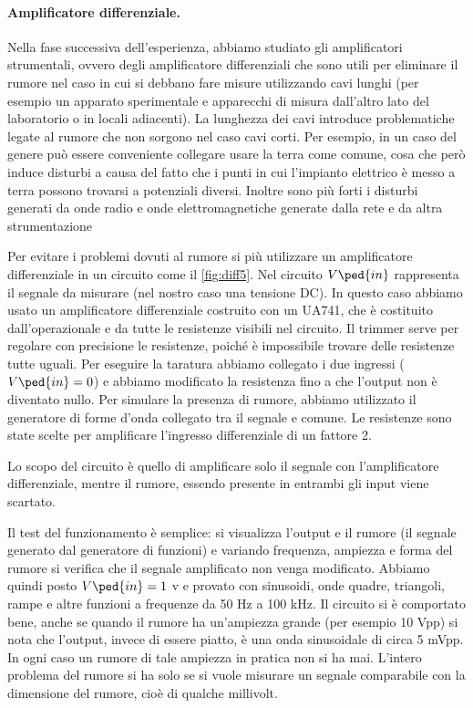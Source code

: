 \paragraph{Amplificatore differenziale.}

Nella fase successiva dell'esperienza, abbiamo studiato gli amplificatori strumentali, ovvero degli
amplificatore differenziali che sono utili per eliminare il rumore nel caso in cui si debbano fare misure
utilizzando cavi lunghi (per esempio un apparato sperimentale e apparecchi di misura dall'altro lato
del laboratorio o in locali adiacenti). La lunghezza dei cavi introduce problematiche legate al rumore che non
sorgono nel caso cavi corti. Per esempio, in un caso del genere può essere conveniente collegare usare la terra
come comune, cosa che però induce disturbi a causa del fatto che i punti in cui l'impianto elettrico è messo a terra
possono trovarsi a potenziali diversi. Inoltre sono più forti i disturbi generati da onde radio e onde elettromagnetiche
generate dalla rete e da altra strumentazione

Per evitare i problemi dovuti al rumore si più utilizzare un amplificatore differenziale in un circuito come il
\ref{fig:diff5}. Nel circuito $V\ped{in}$ rappresenta il segnale da misurare (nel nostro caso una tensione DC).
In questo caso abbiamo usato un amplificatore differenziale costruito con un UA741, che è costituito dall'operazionale
e da tutte le resistenze visibili nel circuito. Il trimmer serve per regolare con precisione le resistenze,
poiché è impossibile trovare delle resistenze tutte uguali. Per eseguire la taratura abbiamo collegato i due ingressi
($V\ped{in} = 0$) e abbiamo modificato la resistenza fino a che l'output non è diventato nullo. 
Per simulare la presenza di rumore, abbiamo utilizzato il generatore di forme d'onda collegato tra il segnale e comune.
Le resistenze sono state scelte per amplificare l'ingresso differenziale di un fattore 2.

Lo scopo del circuito è quello di amplificare solo il segnale con l'amplificatore differenziale, mentre il rumore,
essendo presente in entrambi gli input viene scartato.

Il test del funzionamento è semplice: si visualizza l'output e il rumore (il segnale generato dal generatore di funzioni)
e variando frequenza, ampiezza e forma del rumore si verifica che il segnale amplificato non venga modificato.
Abbiamo quindi posto $V\ped{in} = 1$ v e provato con sinusoidi, onde quadre, triangoli, rampe e altre funzioni a frequenze
da 50 Hz a 100 kHz. Il circuito si è comportato bene, anche se quando il rumore ha un'ampiezza grande (per esempio 10 Vpp)
si nota che l'output, invece di essere piatto, è una onda sinusoidale di circa 5 mVpp. In ogni caso un rumore di tale
ampiezza in pratica non si ha mai. L'intero problema del rumore si ha solo se si vuole misurare un segnale comparabile
con la dimensione del rumore, cioè di qualche millivolt.

